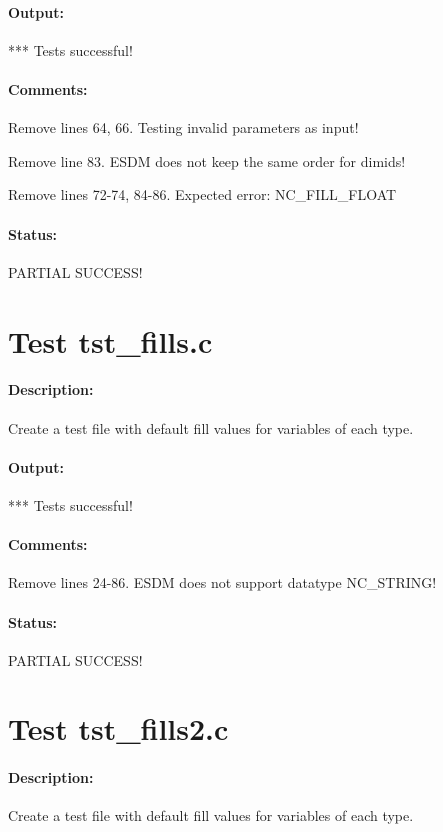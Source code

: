 \paragraph{Output:} *** Tests successful!

\paragraph{Comments:} Remove lines 64, 66. Testing invalid parameters as input!

Remove line 83. ESDM does not keep the same order for dimids!

Remove lines 72-74, 84-86. Expected error: NC\_FILL\_FLOAT

\paragraph{Status:} PARTIAL SUCCESS!

\section{Test tst\_fills.c}

\paragraph{Description:} Create a test file with default fill values for variables of each type.

\paragraph{Output:} *** Tests successful!

\paragraph{Comments:} Remove lines 24-86. ESDM does not support datatype NC\_STRING!

\paragraph{Status:} PARTIAL SUCCESS!

\section{Test tst\_fills2.c}

\paragraph{Description:} Create a test file with default fill values for variables of each type.

